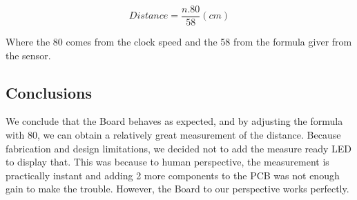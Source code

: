 \[
Distance=\frac{n.80}{58}(cm)
\]

Where the 80 comes from the clock speed and the 58 from the formula
giver from the sensor.

\subsection{Conclusions}

We conclude that the Board behaves as expected, and by adjusting the
formula with 80, we can obtain a relatively great measurement of the
distance. Because fabrication and design limitations, we decided not
to add the measure ready LED to display that. This was because to
human perspective, the measurement is practically instant and adding
2 more components to the PCB was not enough gain to make the trouble.
However, the Board to our perspective works perfectly.
